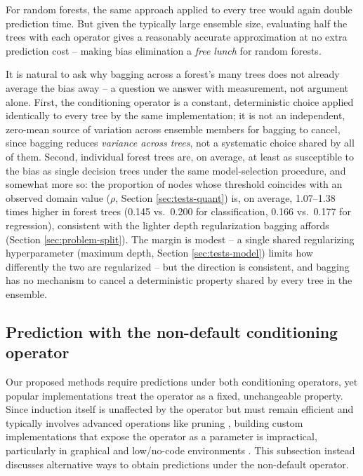 \documentclass[5p,twocolumn,authoryear]{elsarticle}
\theoremstyle{plain}%
\theoremstyle{remark}%
\theoremstyle{definition}%
\begin{document}
For random forests, the same approach applied to every tree would again double prediction time. But given the typically large ensemble size, evaluating half the trees with each operator gives a reasonably accurate approximation at no extra prediction cost -- making bias elimination a \emph{free lunch} for random forests.

It is natural to ask why bagging across a forest's many trees does not already average the bias away -- a question we answer with measurement, not argument alone. First, the conditioning operator is a constant, deterministic choice applied identically to every tree by the same implementation; it is not an independent, zero-mean source of variation across ensemble members for bagging to cancel, since bagging reduces \emph{variance across trees}, not a systematic choice shared by all of them. Second, individual forest trees are, on average, at least as susceptible to the bias as single decision trees under the same model-selection procedure, and somewhat more so: the proportion of nodes whose threshold coincides with an observed domain value ($\rho$, Section \ref{sec:tests-quant}) is, on average, 1.07--1.38 times higher in forest trees (0.145 vs.\ 0.200 for classification, 0.166 vs.\ 0.177 for regression), consistent with the lighter depth regularization bagging affords (Section \ref{sec:problem-split}). The margin is modest -- a single shared regularizing hyperparameter (maximum depth, Section \ref{sec:tests-model}) limits how differently the two are regularized -- but the direction is consistent, and bagging has no mechanism to cancel a deterministic property shared by every tree in the ensemble.

\subsection{Prediction with the non-default conditioning operator}
\label{sec:equiv}

Our proposed methods require predictions under both conditioning operators, yet popular implementations treat the operator as a fixed, unchangeable property. Since induction itself is unaffected by the operator but must remain efficient and typically involves advanced operations like pruning \citep{sklearn}, building custom implementations that expose the operator as a parameter is impractical, particularly in graphical and low/no-code environments \citep{nocode}. This subsection instead discusses alternative ways to obtain predictions under the non-default operator.
\end{document}
